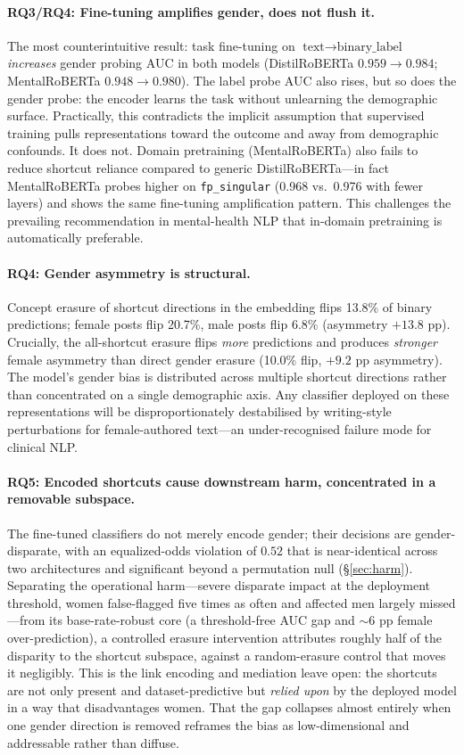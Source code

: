 \documentclass[11pt]{article}
\begin{document}
\paragraph{RQ3/RQ4: Fine-tuning amplifies gender, does not flush it.}
The most counterintuitive result: task fine-tuning on $\text{text} \to \text{binary\_label}$ \emph{increases} gender probing AUC in both models (DistilRoBERTa $0.959 \to 0.984$; MentalRoBERTa $0.948 \to 0.980$). The label probe AUC also rises, but so does the gender probe: the encoder learns the task without unlearning the demographic surface. Practically, this contradicts the implicit assumption that supervised training pulls representations toward the outcome and away from demographic confounds. It does not. Domain pretraining (MentalRoBERTa) also fails to reduce shortcut reliance compared to generic DistilRoBERTa---in fact MentalRoBERTa probes higher on \texttt{fp\_singular} (0.968 vs.\ 0.976 with fewer layers) and shows the same fine-tuning amplification pattern. This challenges the prevailing recommendation in mental-health NLP that in-domain pretraining is automatically preferable.

\paragraph{RQ4: Gender asymmetry is structural.}
Concept erasure of shortcut directions in the embedding flips 13.8\% of binary predictions; female posts flip 20.7\%, male posts flip 6.8\% (asymmetry $+13.8$ pp). Crucially, the all-shortcut erasure flips \emph{more} predictions and produces \emph{stronger} female asymmetry than direct gender erasure (10.0\% flip, $+9.2$ pp asymmetry). The model's gender bias is distributed across multiple shortcut directions rather than concentrated on a single demographic axis. Any classifier deployed on these representations will be disproportionately destabilised by writing-style perturbations for female-authored text---an under-recognised failure mode for clinical NLP.

\paragraph{RQ5: Encoded shortcuts cause downstream harm, concentrated in a removable subspace.}
The fine-tuned classifiers do not merely encode gender; their decisions are gender-disparate, with an equalized-odds violation of $0.52$ that is near-identical across two architectures and significant beyond a permutation null (\S\ref{sec:harm}). Separating the operational harm---severe disparate impact at the deployment threshold, women false-flagged five times as often and affected men largely missed---from its base-rate-robust core (a threshold-free AUC gap and $\sim$6 pp female over-prediction), a controlled erasure intervention attributes roughly half of the disparity to the shortcut subspace, against a random-erasure control that moves it negligibly. This is the link encoding and mediation leave open: the shortcuts are not only present and dataset-predictive but \emph{relied upon} by the deployed model in a way that disadvantages women. That the gap collapses almost entirely when one gender direction is removed reframes the bias as low-dimensional and addressable rather than diffuse.
\end{document}
